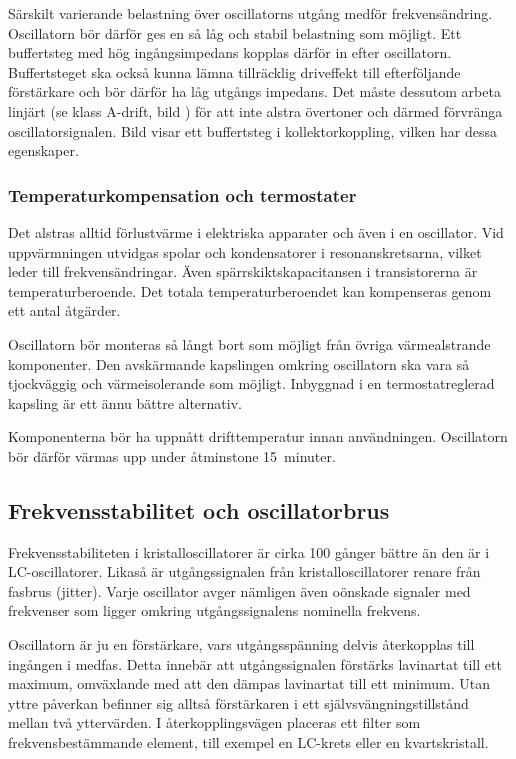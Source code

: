 Särskilt varierande belastning över oscillatorns utgång medför frekvensändring.
Oscillatorn bör därför ges en så låg och stabil belastning som möjligt.
Ett buffertsteg med hög ingångsimpedans kopplas därför in efter oscillatorn.
Buffertsteget ska också kunna lämna tillräcklig driveffekt till efterföljande 
förstärkare och bör därför ha låg utgångs impedans.
Det måste dessutom arbeta linjärt (se klass A-drift, bild )
för att inte alstra övertoner och därmed förvränga oscillatorsignalen.
Bild  visar ett buffertsteg i kollektorkoppling, vilken har
dessa egenskaper.

\subsubsection{Temperaturkompensation och termostater}

Det alstras alltid förlustvärme i elektriska apparater och även i en oscillator.
Vid uppvärmningen utvidgas spolar och kondensatorer i resonanskretsarna,
vilket leder till frekvensändringar.
Även spärrskiktskapacitansen i transistorerna är temperaturberoende.
Det totala temperaturberoendet kan kompenseras genom ett antal åtgärder.

\newpage
Oscillatorn bör monteras så långt bort som möjligt från övriga
värmealstrande komponenter.
Den avskärmande kapslingen omkring oscillatorn ska vara så tjockväggig och
värmeisolerande som möjligt.
Inbyggnad i en termostatreglerad kapsling är ett ännu bättre alternativ.

Komponenterna bör ha uppnått drifttemperatur innan användningen.
Oscillatorn bör därför värmas upp under åtminstone 15~minuter.

\subsection{Frekvensstabilitet och oscillatorbrus}

Frekvensstabiliteten i kristalloscillatorer är cirka 100 gånger bättre än
den är i LC-oscillatorer.
Likaså är utgångssignalen från kristalloscillatorer renare från fasbrus (jitter).
Varje oscillator avger nämligen även oönskade signaler med frekvenser som
ligger omkring utgångssignalens nominella frekvens.

Oscillatorn är ju en förstärkare, vars utgångsspänning delvis
återkopplas till ingången i medfas.
Detta innebär att utgångssignalen förstärks lavinartat till ett maximum,
omväxlande med att den dämpas lavinartat till ett minimum.
Utan yttre påverkan befinner sig alltså förstärkaren i ett
självsvängningstillstånd mellan två yttervärden.
I återkopplingsvägen placeras ett filter som frekvensbestämmande
element, till exempel en LC-krets eller en kvartskristall.

